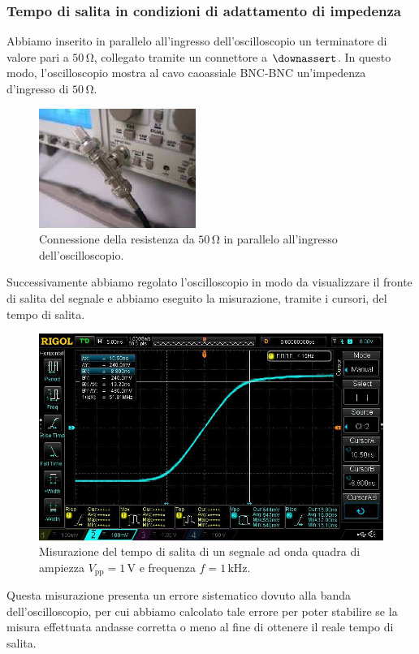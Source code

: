 \documentclass{article}
\begin{document}
			\subsubsection{Tempo di salita in condizioni di adattamento di impedenza}
				Abbiamo inserito in parallelo all'ingresso dell'oscilloscopio un terminatore di valore pari a $ 50 \, \mathrm{\Omega} $, collegato tramite un connettore a $ \mathrm{\downassert} $. In questo modo, l'oscilloscopio mostra al cavo caoassiale BNC-BNC un'impedenza d'ingresso di $ 50 \, \mathrm{\Omega} $.
				\begin{figure}[h!]
					\centering
					\includegraphics[scale=0.7]{connettoreAT}
					\caption{Connessione della resistenza da $ 50 \, \mathrm{\Omega} $ in parallelo all'ingresso dell'oscilloscopio.}
					\label{fig:connettoreAT}
				\end{figure}
				\newpage
				Successivamente abbiamo regolato l'oscilloscopio in modo da visualizzare il fronte di salita del segnale e abbiamo eseguito la misurazione, tramite i cursori, del tempo di salita.
				\begin{figure}[h!]
					\centering
					\includegraphics[scale=0.3]{tempoSalitaAdattamentoImpedenza}
					\caption{Misurazione del tempo di salita di un segnale ad onda quadra di ampiezza $ V_{\mathrm{pp}} = 1 \, \mathrm{V} $ e frequenza $ f = 1 \, \mathrm{kHz} $.}
					\label{fig:tempoSalitaAdattamentoImpedenza}
				\end{figure}
				\newline
				Questa misurazione presenta un errore sistematico dovuto alla banda dell'oscilloscopio, per cui abbiamo calcolato tale errore per poter stabilire se la misura effettuata andasse corretta o meno al fine di ottenere il reale tempo di salita.
\end{document}

